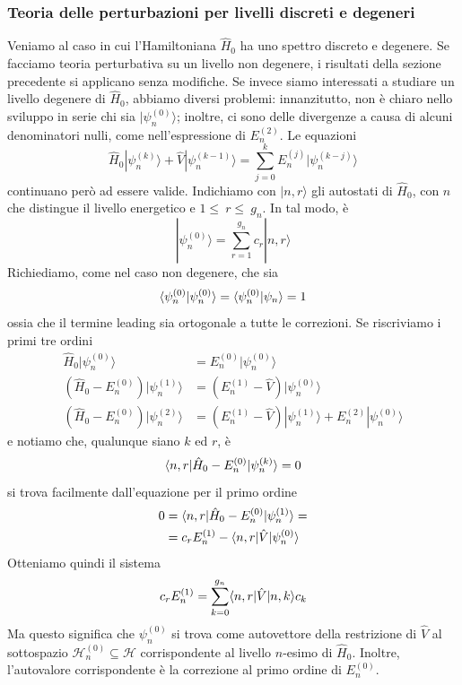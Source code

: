 \documentclass[a4paper, 11pt]{article}
\newcommand{\op}[1]{\hat{#1}}
\renewcommand{\H}{\mathcal{H}}
\renewcommand{\op}[1]{\hat{#1}}
\newcommand{\ham}{\hat{H}}
\renewcommand{\ket}[1]{| #1\rangle}
\begin{document}
\subsubsection{Teoria delle perturbazioni per livelli discreti e degeneri}
Veniamo al caso in cui l'Hamiltoniana $\ham_0$ ha uno spettro discreto e degenere. Se facciamo teoria perturbativa su un livello non degenere, i risultati della sezione precedente si applicano senza modifiche. Se invece siamo interessati a studiare un livello degenere di $\ham_0$, abbiamo diversi problemi: innanzitutto, non è chiaro nello sviluppo in serie chi sia $\ket{\psi_n^{(0)}}$; inoltre, ci sono delle divergenze a causa di alcuni denominatori nulli, come nell'espressione di $E_n^{(2)}$. Le equazioni
\[\ham_0\ket{\psi_n^{(k)}}+\op V\ket{\psi_n^{(k-1)}}=\sum_{j=0}^{k}E_n^{(j)}\ket{\psi_n^{(k-j)}}\]
continuano però ad essere valide. Indichiamo con $\ket{n,r}$ gli autostati di $\ham_0$, con $n$ che distingue il livello energetico e $1\leq~ r\leq ~g_n$. In tal modo, è
\[\ket{\psi_n^{(0)}}=\sum_{r=1}^{g_n}c_r\ket{n,r}\]
Richiediamo, come nel caso non degenere, che sia
\[\langle \psi_n^{(0)}\vert\psi_n^{(0)}\rangle=\langle \psi_n^{(0)}\vert\psi_n\rangle=1\]
ossia che il termine leading sia ortogonale a tutte le correzioni. Se riscriviamo i primi tre ordini
\begin{align*}
\ham_0\ket{\psi_n^{(0)}}&=E_n^{(0)}\ket{\psi_n^{(0)}}\\
(\ham_0-E_n^{(0)})\ket{\psi_n^{(1)}}&=(E_n^{(1)}-\op V)\ket{\psi_n^{(0)}}\\(\ham_0-E_n^{(0)})\ket{\psi_n^{(2)}}&=(E_n^{(1)}-\op V)\ket{\psi_n^{(1)}}+E_n^{(2)}\ket{\psi_n^{(0)}}
\end{align*}
e notiamo che, qualunque siano $k$ ed $r$, è
\[\braketop{n,r}{\ham_0-E_n^{(0)}}{\psi_n^{(k)}}=0\]
si trova facilmente dall'equazione per il primo ordine
\begin{align*}
	0&=\braketop{n,r}{\ham_0-E_n^{(0)}}{\psi_n^{(1)}}=\\&=c_rE_n^{(1)}-\braketop{n,r}{\op V}{\psi_n^{(0)}}
\end{align*}
 Otteniamo quindi il sistema
 \[c_rE_n^{(1)}=\sum_{k=0}^{g_n}\braketop{n,r}{\op V}{n,k}c_k\]
 Ma questo significa che $\psi_n^{(0)}$ si trova come autovettore della restrizione di $\op V$ al sottospazio $\H^{(0)}_n\subseteq\H$ corrispondente al livello $n$-esimo di $\ham_0$. Inoltre, l'autovalore corrispondente è la correzione al primo ordine di $E_n^{(0)}$.
 
\end{document}
